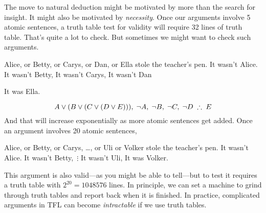 The move to natural deduction might be motivated by more than the search for insight. It might also be motivated by \emph{necessity}. Once our arguments involve 5 atomic sentences,  a truth table test for validity will require 32 lines of truth table. That's quite a lot to check. But sometimes we might want to check such arguments. 
\begin{center}
\begin{earg}
\prem Alice, or Betty, or Carys, or Dan, or Ella stole the teacher's pen.
\prem It wasn't Alice.
\prem It wasn't Betty,
\prem It wasn't Carys,
\prem It wasn't Dan
\item [\therefore] It was Ella. 
\end{earg}
\end{center}
$$A\eor(B\eor (C\eor (D\eor E))),\;\enot A,\;\enot B,\;\enot C,\;\enot D\;\therefore\;E$$
And that will increase exponentially as more atomic sentences get added. Once an argument involves 20 atomic sentences, 
\begin{center}
\begin{earg}
\prem Alice, or Betty, or Carys, \ldots, or Uli or Volker stole the teacher's pen.
\prem It wasn't Alice.
\prem It wasn't Betty,
\prem\,$\vdots$
\prem It wasn't Uli,
\conc It was Volker. 
\end{earg}
\end{center}
This argument is also valid---as you might be able to tell---but to test it requires a truth table with $2^{20} = 1048576$ lines. In principle, we can set a machine to grind through truth tables and report back when it is finished. In practice, complicated arguments in TFL can become \emph{intractable} if we use truth tables.


